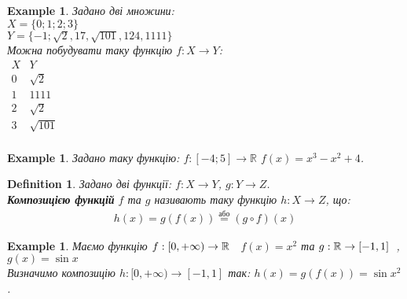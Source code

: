 \documentclass[a4paper, 14pt]{article}
\theoremstyle{theoremdd}
\theoremstyle{theoremdd}
\newtheorem{definition}[theorem]{Definition}
\theoremstyle{theoremdd}
\theoremstyle{theoremdd}
\newtheorem{example}[theorem]{Example}
\theoremstyle{theoremdd}
\theoremstyle{theoremdd}
\theoremstyle{theoremdd}
\theoremstyle{theoremdd}
\begin{document}
	\begin{example}
	Задано дві множини:\\
	$X = \{0; 1; 2; 3 \}$ \\ $Y = \{-1; \sqrt{2}, 17, \sqrt{101}, 124, 1111\}$\\ 
	Можна побудувати таку функцію $f: X \to Y$:\\
	$\begin{matrix}
	X & Y \\
	0 & \sqrt{2} \\
	1 & 1111 \\
	2 & \sqrt{2} \\
	3 & \sqrt{101} \\
	\end{matrix}$
	\end{example}
	
	\begin{example}
	Задано таку функцію: $f: [-4; 5] \to \mathbb{R}$ \hspace{1cm} $f(x) = x^3-x^2+4$.
	\end{example}
	
	\begin{definition}
	Задано дві функції: $f: X \to Y$, $g: Y \to Z$.\\
	\textbf{Композицією функцій} $f$ та $g$ називають таку функцію $h: X \to Z$, що:
	\begin{align*}
	h(x) = g(f(x)) \overset{\text{або}}{=} (g \circ f) (x)
	\end{align*}
	\begin{figure}[H]
\end{figure}
	\end{definition}
	
	\begin{example}
	Маємо функцію $f: [0,+\infty) \to \mathbb{R} \hspace{0.2cm}$ $f(x) = x^2$ та $g: \mathbb{R} \to [-1,1] \hspace{0.2cm}$, $g(x) = \sin x$\\
	Визначимо композицію $h: [0,+\infty) \to [-1,1]$ так: $h(x) = g(f(x)) = \sin x^2$.
	\end{example}
	
\end{document}
